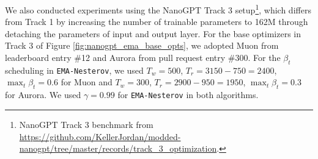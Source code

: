 \documentclass{article}
\theoremstyle{plain}
\theoremstyle{definition}
\theoremstyle{remark}
\def\algname{{\tt EMA-Nesterov}}
\begin{document}
We also conducted experiments using the NanoGPT Track 3 setup\footnote{NanoGPT Track 3 benchmark from \url{https://github.com/KellerJordan/modded-nanogpt/tree/master/records/track_3_optimization}.}, which differs from Track 1 by increasing the number of trainable parameters to 162M through detaching the parameters of input and output layer. For the base optimizers in Track 3 of Figure \ref{fig:nanogpt_ema_base_opts},
we adopted Muon from leaderboard entry \#12
and Aurora from pull request entry \#300. For the $\beta_t$ scheduling in {\algname}, we used $T_w = 500$, $T_r = 3150 - 750 = 2400$, $\max_t \beta_t = 0.6$ for Muon and $T_w = 300$, $T_r = 2900 - 950 = 1950$, $\max_t \beta_t =0.3$ for Aurora. We used $\gamma = 0.99$ for {\algname} in both algorithms.
\begin{table}[hbt!] 
    \centering
    \caption{Hyperparameter values of the base optimizers used in NanoGPT Track 1 (Figure \ref{fig:nanogpt_ema_base_opts} and \ref{fig:nanogpt_ema_pessimistic_gpa_snoo}).}
    \label{tab:nanogpt_hp}
\end{table}
\end{document}
